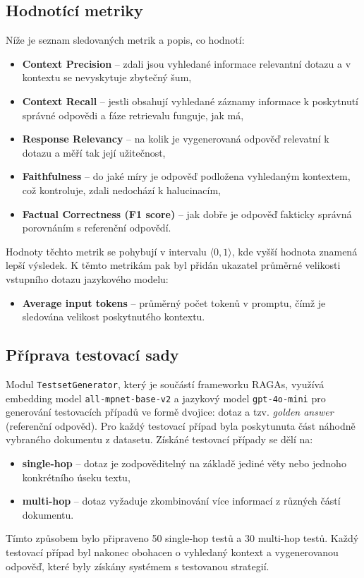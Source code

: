 \subsection{Hodnotící metriky}
Níže je seznam sledovaných metrik a popis, co hodnotí:
\begin{itemize}
    \item \textbf{Context Precision} – zdali jsou vyhledané informace relevantní dotazu a v kontextu se nevyskytuje zbytečný šum,
    \item \textbf{Context Recall} – jestli obsahují vyhledané záznamy informace k poskytnutí správné odpovědi a fáze retrievalu funguje, jak má,
    \item \textbf{Response Relevancy} – na kolik je vygenerovaná odpověď relevatní k dotazu a měří tak její užitečnost,
    \item \textbf{Faithfulness} – do jaké míry je odpověď podložena vyhledaným kontextem, což kontroluje, zdali nedochází k halucinacím,
    \item \textbf{Factual Correctness (F1 score)} – jak dobře je odpověď fakticky správná porovnáním s referenční odpovědí.
\end{itemize}
Hodnoty těchto metrik se pohybují v intervalu $\langle 0, 1 \rangle$, kde vyšší hodnota znamená lepší výsledek. K těmto metrikám pak byl přidán ukazatel průměrné velikosti vstupního dotazu jazykového modelu:
\begin{itemize}
    \item \textbf{Average input tokens} – průměrný počet tokenů v promptu, čímž je sledována velikost poskytnutého kontextu.
\end{itemize}

\subsection{Příprava testovací sady}
Modul \texttt{TestsetGenerator}, který je součástí frameworku RAGAs, využívá embedding model \texttt{all-mpnet-base-v2} a jazykový model \texttt{gpt-4o-mini} pro generování testovacích případů ve formě dvojice: dotaz a tzv. \textit{golden answer} (referenční odpověd). Pro každý testovací případ byla poskytunuta část náhodně vybraného dokumentu z datasetu. Získáné testovací případy se dělí na:
\begin{itemize}
    \item \textbf{single-hop} – dotaz je zodpověditelný na základě jediné věty nebo jednoho konkrétního úseku textu,
    \item \textbf{multi-hop} – dotaz vyžaduje zkombinování více informací z různých částí dokumentu.
\end{itemize}
Tímto způsobem bylo připraveno 50 single-hop testů a 30 multi-hop testů. Každý testovací případ byl nakonec obohacen o vyhledaný kontext a vygenerovanou odpověď, které byly získány systémem s testovanou strategií.

